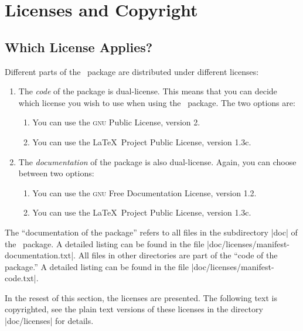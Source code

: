 %
%
%


\section{Licenses and Copyright}
\label{section-license}


\subsection{Which License Applies?}

Different parts of the \beamer\ package are distributed under
different licenses:

\begin{enumerate}
\item The \emph{code} of the package is dual-license. This
  means that you can decide which license you wish to use when using the
  \beamer\ package. The two options are:
  \begin{enumerate}
  \item You can use the \textsc{gnu} Public License, version 2.
  \item You can use the \LaTeX\ Project Public License, version 1.3c.
  \end{enumerate}
\item The \emph{documentation} of the package is also dual-license. Again,
  you can choose between two options:
  \begin{enumerate}
  \item You can use the \textsc{gnu} Free Documentation License, version 1.2.
  \item You can use the \LaTeX\ Project Public License, version 1.3c.
  \end{enumerate}
\end{enumerate}

The ``documentation of the package'' refers to all files in the
subdirectory |doc| of the \beamer\ package. A detailed listing can be
found in the file |doc/licenses/manifest-documentation.txt|.
All files in other directories are part of the ``code of the
package.'' A detailed listing can be found in the file
|doc/licenses/manifest-code.txt|.

In the resest of this section, the licenses are presented. The
following text is copyrighted, see the plain text versions of these
licenses in the directory |doc/licenses| for details. 


